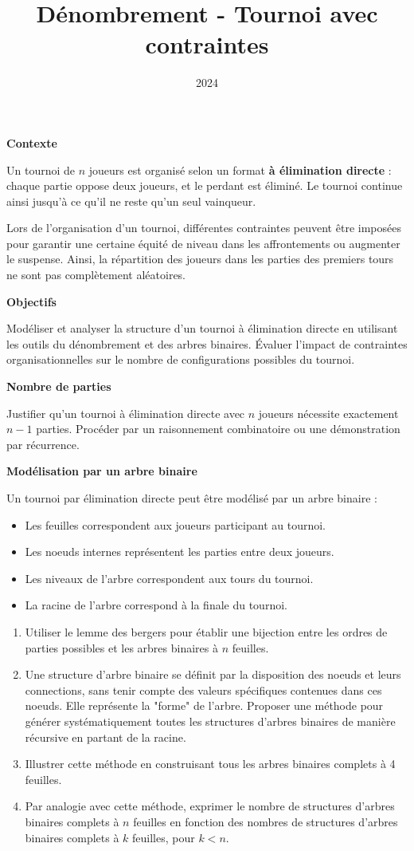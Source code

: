 \documentclass[10pt,a4paper]{article}
\title{Dénombrement - Tournoi avec contraintes}
\author{}
\date{2024}
\begin{document}
\textbf{Contexte}

Un tournoi de \( n \) joueurs est organisé selon un format \textbf{à élimination directe} : chaque
partie oppose deux joueurs, et le perdant est éliminé. Le tournoi continue ainsi jusqu'à ce qu'il ne
reste qu'un seul vainqueur.

Lors de l'organisation d'un tournoi, différentes contraintes peuvent être imposées pour garantir une
certaine équité de niveau dans les affrontements ou augmenter le suspense. Ainsi, la répartition des
joueurs dans les parties des premiers tours ne sont pas complètement aléatoires.

\textbf{Objectifs}

Modéliser et analyser la structure d'un tournoi à élimination directe en utilisant les outils du
dénombrement et des arbres binaires. Évaluer l'impact de contraintes organisationnelles sur le
nombre de configurations possibles du tournoi.


\q \textbf{Nombre de parties}

Justifier qu'un tournoi à élimination directe avec \( n \) joueurs nécessite exactement \( n-1 \)
parties. Procéder par un raisonnement combinatoire ou une démonstration par récurrence.

\q \textbf{Modélisation par un arbre binaire}

Un tournoi par élimination directe peut être modélisé par un arbre binaire :
\begin{itemize}
    \item Les feuilles correspondent aux joueurs participant au tournoi.
    \item Les noeuds internes représentent les parties entre deux joueurs.
    \item Les niveaux de l'arbre correspondent aux tours du tournoi.
    \item La racine de l'arbre correspond à la finale du tournoi.
\end{itemize}



\begin{enumerate}
    \item Utiliser le lemme des bergers pour établir une bijection entre les ordres de parties
    possibles et les arbres binaires à $ n $ feuilles.
    \item Une structure d'arbre binaire se définit par la disposition des noeuds et leurs
    connections, sans tenir compte des valeurs spécifiques contenues dans ces noeuds. Elle
    représente la "forme" de l'arbre. Proposer une méthode pour générer systématiquement toutes les
    structures d'arbres binaires de manière récursive en partant de la racine.
    \item Illustrer cette méthode en construisant tous les arbres binaires complets à 4 feuilles.
    \item Par analogie avec cette méthode, exprimer le nombre de structures d'arbres binaires
    complets à $n$ feuilles en fonction des nombres de structures d'arbres binaires complets à $k$
    feuilles, pour $k < n$.
\end{enumerate}
\end{document}
